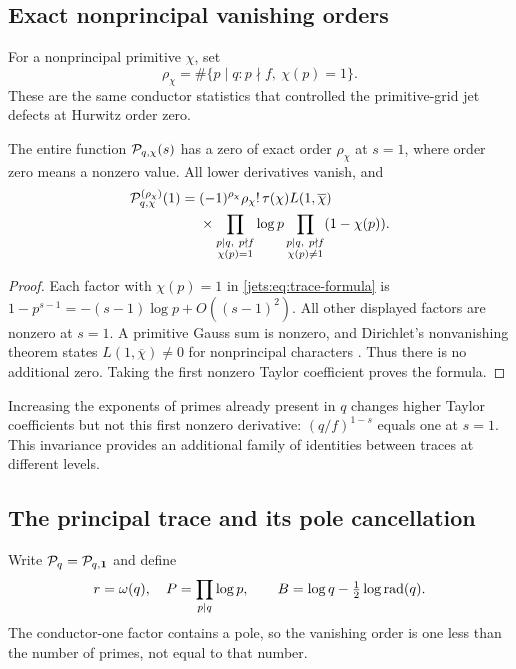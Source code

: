 \subsection{Exact nonprincipal vanishing orders}
For a nonprincipal primitive $\chi$, set
\[
 \rho_\chi=\#\{p\mid q:p\nmid f,\ \chi(p)=1\}.
\]
These are the same conductor statistics that controlled the
primitive-grid jet defects at Hurwitz order zero.

\begin{theorem}\label{jets:thm:trace-zero}
The entire function $\mathcal P_{q,\chi}(s)$ has a zero of exact order
$\rho_\chi$ at $s=1$, where order zero means a nonzero value.
All lower derivatives vanish, and
\begin{align}\label{jets:eq:trace-leading}
 \mathcal P_{q,\chi}^{(\rho_\chi)}(1)
 ={}&(-1)^{\rho_\chi}\rho_\chi!\,
 \tau(\chi)L(1,\overline\chi)\notag\\
 &\times\prod_{\substack{p\mid q,\ p\nmid f\\\chi(p)=1}}\log p
 \prod_{\substack{p\mid q,\ p\nmid f\\\chi(p)\ne1}}(1-\chi(p)).
\end{align}
\end{theorem}
\begin{proof}
Each factor with $\chi(p)=1$ in \eqref{jets:eq:trace-formula} is
$1-p^{s-1}=-(s-1)\log p+O((s-1)^2)$.
All other displayed factors are nonzero at $s=1$.
A primitive Gauss sum is nonzero, and Dirichlet's nonvanishing theorem
states $L(1,\overline\chi)\ne0$ for nonprincipal characters
\cite[Eq.~25.15.9]{jets:dlmf-dirichlet}. Thus there is no additional zero.
Taking the first nonzero Taylor coefficient proves the formula.
\end{proof}

Increasing the exponents of primes already present in $q$ changes
higher Taylor coefficients but not this first nonzero derivative:
$(q/f)^{1-s}$ equals one at $s=1$. This invariance provides an
additional family of identities between traces at different levels.

\subsection{The principal trace and its pole cancellation}
Write $\mathcal P_q=\mathcal P_{q,\mathbf1}$ and define
\[
 r=\omega(q),\quad P=\prod_{p\mid q}\log p,\qquad
 B=\log q-\tfrac12\log\operatorname{rad}(q).
\]
The conductor-one factor contains a pole, so the vanishing order is
one less than the number of primes, not equal to that number.

